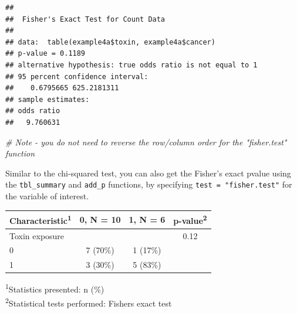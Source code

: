\documentclass[]{book}
\newenvironment{Shaded}{\begin{snugshade}}{\end{snugshade}}
\newcommand{\CommentTok}[1]{\textcolor[rgb]{0.56,0.35,0.01}{\textit{#1}}}
\newcommand{\DataTypeTok}[1]{\textcolor[rgb]{0.13,0.29,0.53}{#1}}
\newcommand{\KeywordTok}[1]{\textcolor[rgb]{0.13,0.29,0.53}{\textbf{#1}}}
\newcommand{\NormalTok}[1]{#1}
\newcommand{\OperatorTok}[1]{\textcolor[rgb]{0.81,0.36,0.00}{\textbf{#1}}}
\newcommand{\StringTok}[1]{\textcolor[rgb]{0.31,0.60,0.02}{#1}}
\begin{document}
\begin{Shaded}
\end{Shaded}

\begin{verbatim}
## 
##  Fisher's Exact Test for Count Data
## 
## data:  table(example4a$toxin, example4a$cancer)
## p-value = 0.1189
## alternative hypothesis: true odds ratio is not equal to 1
## 95 percent confidence interval:
##    0.6795665 625.2181311
## sample estimates:
## odds ratio 
##   9.760631
\end{verbatim}

\begin{Shaded}
\begin{Highlighting}[]
\CommentTok{# Note - you do not need to reverse the row/column order for the "fisher.test" function}
\end{Highlighting}
\end{Shaded}

Similar to the chi-squared test, you can also get the Fisher's exact
pvalue using the \texttt{tbl\_summary} and \texttt{add\_p} functions, by
specifying \texttt{test\ =\ "fisher.test"} for the variable of interest.

\begin{Shaded}
\end{Shaded}

\captionsetup[table]{labelformat=empty,skip=1pt}
\begin{longtable}{lccc}
\toprule
\textbf{Characteristic}\textsuperscript{1} & \textbf{0}, N = 10 & \textbf{1}, N = 6 & \textbf{p-value}\textsuperscript{2} \\ 
\midrule
Toxin exposure &  &  & 0.12 \\ 
0 & 7 (70\%) & 1 (17\%) &  \\ 
1 & 3 (30\%) & 5 (83\%) &  \\ 
\bottomrule
\end{longtable}
\vspace{-5mm}
\begin{minipage}{\linewidth}
\textsuperscript{1}Statistics presented: n (\%) \\ 
\textsuperscript{2}Statistical tests performed: Fisher\textquotesingle{}s exact test \\ 
\end{minipage}
\end{document}
